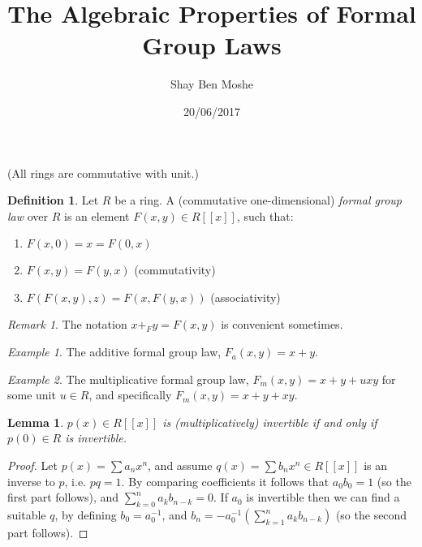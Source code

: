 \documentclass{article}
\title{The Algebraic Properties of Formal Group Laws}
\author{Shay Ben Moshe}
\date{20/06/2017}
\newtheorem*{lemma*}{Lemma}
\theoremstyle{definition}
\newtheorem*{definition*}{Definition}
\theoremstyle{remark}
\newtheorem*{remark*}{Remark}
\newtheorem*{example*}{Example}
\begin{document}
	\maketitle
	
	(All rings are commutative with unit.)
	
	\begin{definition*}
		Let $R$ be a ring.
		A (commutative one-dimensional) \emph{formal group law} over $R$ is an element $F\left(x,y\right) \in R\left[\left[x\right]\right]$, such that:
		\begin{enumerate}
			\item $F\left(x,0\right) = x = F\left(0,x\right)$
			\item $F\left(x,y\right)=F\left(y,x\right)$ (commutativity)
			\item $F\left(F\left(x,y\right),z\right)=F\left(x,F\left(y,x\right)\right)$ (associativity)
		\end{enumerate}
	\end{definition*}

	\begin{remark*}
		The notation $x +_F y = F\left(x,y\right)$ is convenient sometimes.
	\end{remark*}

	\begin{example*}
		The additive formal group law, $F_a\left(x,y\right) = x+y$.
	\end{example*}

	\begin{example*}
		The multiplicative formal group law, $F_m\left(x,y\right) = x+y+uxy$ for some unit $u\in R$, and specifically $F_m\left(x,y\right) = x+y+xy$.
	\end{example*}

	\begin{lemma*}
		$p\left(x\right) \in R\left[\left[x\right]\right]$ is (multiplicatively) invertible if and only if $p\left(0\right) \in R$ is invertible.
	\end{lemma*}
	\begin{proof}
		Let $p\left(x\right) = \sum a_n x^n$, and assume $q\left(x\right) = \sum b_n x^n \in R\left[\left[x\right]\right]$ is an inverse to $p$, i.e. $pq = 1$. 
		By comparing coefficients it follows that $a_0 b_0 = 1$ (so the first part follows), and $\sum_{k=0}^n a_k b_{n-k} = 0$.
		If $a_0$ is invertible then we can find a suitable $q$, by defining $b_0 = a_0^{-1}$, and $b_n = - a_0^{-1} \left(\sum_{k=1}^n a_k b_{n-k}\right)$ (so the second part follows).
	\end{proof}
\end{document}
